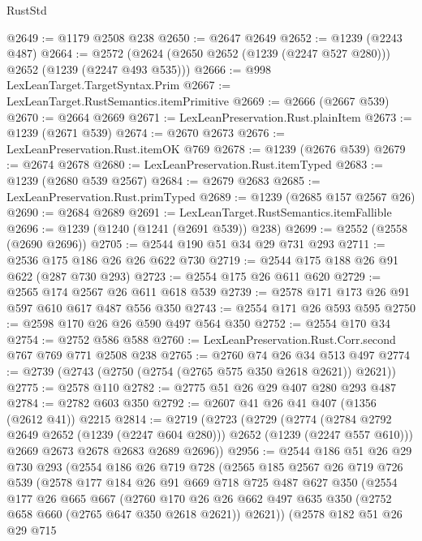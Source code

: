 \begin{lexlean}{RustStd}
\begin{coremodule}
@2649 := @1179 @2508 @238
@2650 := @2647 @2649
@2652 := @1239 (@2243 @487)
@2664 := @2572 (@2624 (@2650 @2652 (@1239 (@2247 @527 @280))) @2652 (@1239 (@2247 @493 @535)))
@2666 := @998 LexLeanTarget.TargetSyntax.Prim
@2667 := LexLeanTarget.RustSemantics.itemPrimitive
@2669 := @2666 (@2667 @539)
@2670 := @2664 @2669
@2671 := LexLeanPreservation.Rust.plainItem
@2673 := @1239 (@2671 @539)
@2674 := @2670 @2673
@2676 := LexLeanPreservation.Rust.itemOK @769
@2678 := @1239 (@2676 @539)
@2679 := @2674 @2678
@2680 := LexLeanPreservation.Rust.itemTyped
@2683 := @1239 (@2680 @539 @2567)
@2684 := @2679 @2683
@2685 := LexLeanPreservation.Rust.primTyped
@2689 := @1239 (@2685 @157 @2567 @26)
@2690 := @2684 @2689
@2691 := LexLeanTarget.RustSemantics.itemFallible
@2696 := @1239 (@1240 (@1241 (@2691 @539)) @238)
@2699 := @2552 (@2558 (@2690 @2696))
@2705 := @2544 @190 @51 @34 @29 @731 @293
@2711 := @2536 @175 @186 @26 @26 @622 @730
@2719 := @2544 @175 @188 @26 @91 @622 (@287 @730 @293)
@2723 := @2554 @175 @26 @611 @620
@2729 := @2565 @174 @2567 @26 @611 @618 @539
@2739 := @2578 @171 @173 @26 @91 @597 @610 @617 @487 @556 @350
@2743 := @2554 @171 @26 @593 @595
@2750 := @2598 @170 @26 @26 @590 @497 @564 @350
@2752 := @2554 @170 @34
@2754 := @2752 @586 @588
@2760 := LexLeanPreservation.Rust.Corr.second @767 @769 @771 @2508 @238
@2765 := @2760 @74 @26 @34 @513 @497
@2774 := @2739 (@2743 (@2750 (@2754 (@2765 @575 @350 @2618 @2621)) @2621))
@2775 := @2578 @110
@2782 := @2775 @51 @26 @29 @407 @280 @293 @487
@2784 := @2782 @603 @350
@2792 := @2607 @41 @26 @41 @407 (@1356 (@2612 @41)) @2215
@2814 := @2719
    (@2723
      (@2729
        (@2774 (@2784 @2792 @2649 @2652 (@1239 (@2247 @604 @280))) @2652 (@1239 (@2247 @557 @610)))
        @2669
        @2673
        @2678
        @2683
        @2689
        @2696))
@2956 := @2544
    @186
    @51
    @26
    @29
    @730
    @293
    (@2554
      @186
      @26
      @719
      @728
      (@2565
        @185
        @2567
        @26
        @719
        @726
        @539
        (@2578
          @177
          @184
          @26
          @91
          @669
          @718
          @725
          @487
          @627
          @350
          (@2554
            @177
            @26
            @665
            @667
            (@2760
              @170
              @26
              @26
              @662
              @497
              @635
              @350
              (@2752 @658 @660 (@2765 @647 @350 @2618 @2621))
              @2621))
          (@2578
            @182
            @51
            @26
            @29
            @715

\end{coremodule}
\end{lexlean}
